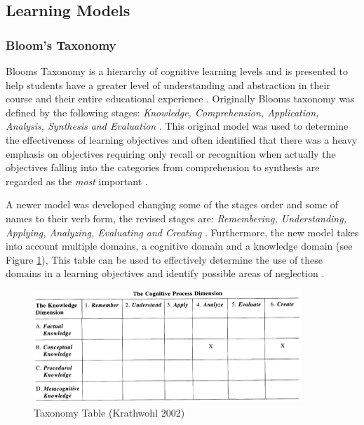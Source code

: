 \documentclass[12pt,a4paper]{article}
\begin{document}
\subsection{Learning Models}
\subsubsection{Bloom's Taxonomy} 
Blooms Taxonomy is a hierarchy of cognitive learning levels and is presented to help students have a greater level of understanding and abstraction in their course and their entire educational experience \cite{bloom1965bloom}. Originally Blooms taxonomy was defined by the following stages: \emph{Knowledge, Comprehension, Application, Analysis, Synthesis and Evaluation} \cite{anderson1994bloom}. This original model was used to determine the effectiveness of learning objectives and often identified that there was a heavy emphasis on objectives requiring only recall or recognition when actually the objectives falling into the categories from comprehension to synthesis are regarded as the \emph{most} important \cite{krathwohl2002revision}.  


A newer model was developed changing some of the stages order and some of names to their verb form, the revised stages are: \emph{Remembering, Understanding, Applying, Analyzing, Evaluating and Creating} \cite{forehand2010bloom}. Furthermore, the new model takes into account multiple domains, a cognitive domain and a knowledge domain (see Figure \ref{fig:fig2}),  This table can be used to effectively determine the use of these domains in a learning objectives and identify possible areas of neglection \cite{krathwohl2002revision2}. 

\begin{figure}[h]
    \centering
    \includegraphics[width=0.9\textwidth]{Figs/blooms.PNG} 
    \caption{Taxonomy Table (Krathwohl 2002)}
    \label{fig:fig2}
\end{figure}  
\end{document}
